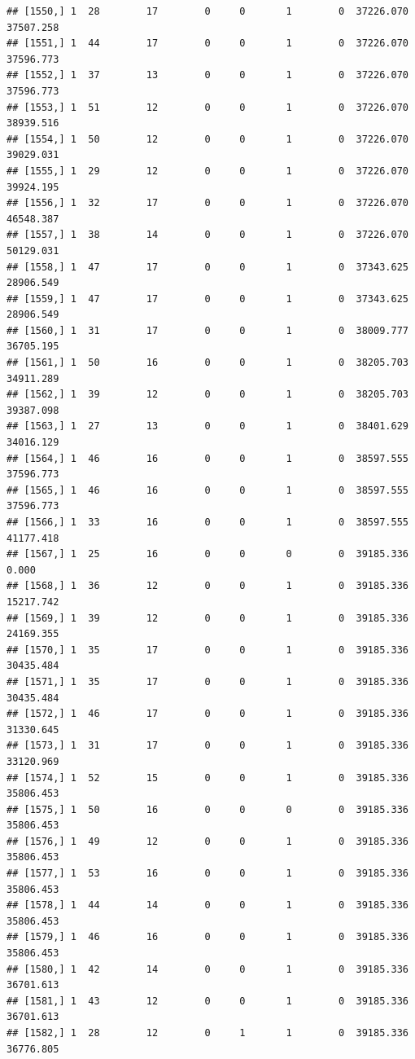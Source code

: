 \documentclass[
]{article}
\begin{document}
\begin{verbatim}
## [1550,] 1  28        17        0     0       1        0  37226.070  37507.258
## [1551,] 1  44        17        0     0       1        0  37226.070  37596.773
## [1552,] 1  37        13        0     0       1        0  37226.070  37596.773
## [1553,] 1  51        12        0     0       1        0  37226.070  38939.516
## [1554,] 1  50        12        0     0       1        0  37226.070  39029.031
## [1555,] 1  29        12        0     0       1        0  37226.070  39924.195
## [1556,] 1  32        17        0     0       1        0  37226.070  46548.387
## [1557,] 1  38        14        0     0       1        0  37226.070  50129.031
## [1558,] 1  47        17        0     0       1        0  37343.625  28906.549
## [1559,] 1  47        17        0     0       1        0  37343.625  28906.549
## [1560,] 1  31        17        0     0       1        0  38009.777  36705.195
## [1561,] 1  50        16        0     0       1        0  38205.703  34911.289
## [1562,] 1  39        12        0     0       1        0  38205.703  39387.098
## [1563,] 1  27        13        0     0       1        0  38401.629  34016.129
## [1564,] 1  46        16        0     0       1        0  38597.555  37596.773
## [1565,] 1  46        16        0     0       1        0  38597.555  37596.773
## [1566,] 1  33        16        0     0       1        0  38597.555  41177.418
## [1567,] 1  25        16        0     0       0        0  39185.336      0.000
## [1568,] 1  36        12        0     0       1        0  39185.336  15217.742
## [1569,] 1  39        12        0     0       1        0  39185.336  24169.355
## [1570,] 1  35        17        0     0       1        0  39185.336  30435.484
## [1571,] 1  35        17        0     0       1        0  39185.336  30435.484
## [1572,] 1  46        17        0     0       1        0  39185.336  31330.645
## [1573,] 1  31        17        0     0       1        0  39185.336  33120.969
## [1574,] 1  52        15        0     0       1        0  39185.336  35806.453
## [1575,] 1  50        16        0     0       0        0  39185.336  35806.453
## [1576,] 1  49        12        0     0       1        0  39185.336  35806.453
## [1577,] 1  53        16        0     0       1        0  39185.336  35806.453
## [1578,] 1  44        14        0     0       1        0  39185.336  35806.453
## [1579,] 1  46        16        0     0       1        0  39185.336  35806.453
## [1580,] 1  42        14        0     0       1        0  39185.336  36701.613
## [1581,] 1  43        12        0     0       1        0  39185.336  36701.613
## [1582,] 1  28        12        0     1       1        0  39185.336  36776.805

\end{verbatim}
\end{document}
